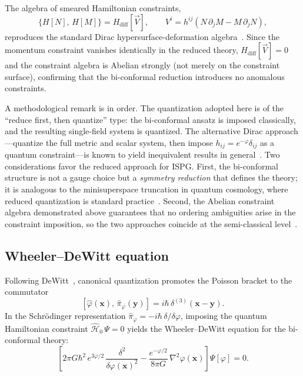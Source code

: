 \documentclass[aps,prd,onecolumn,superscriptaddress,nofootinbib,showpacs,12pt,notitlepage]{revtex4-2}
\begin{document}
The algebra of smeared Hamiltonian constraints,
\begin{equation}\label{eq:HH_algebra}
  \{H[N],\,H[M]\} = H_{\mathrm{diff}}[\vec{V}],\qquad
  V^i = h^{ij}(N\,\partial_j M - M\,\partial_j N),
\end{equation}
reproduces the standard Dirac hypersurface-deformation
algebra~\cite{DeWitt1967}.  Since the momentum constraint
vanishes identically in the reduced theory,
$H_{\mathrm{diff}}[\vec{V}] = 0$ and the constraint algebra
is Abelian strongly (not merely on the constraint surface),
confirming that the bi-conformal reduction introduces no
anomalous constraints.

A methodological remark is in order.  The quantization
adopted here is of the ``reduce first, then quantize''
type: the bi-conformal ansatz is imposed classically,
and the resulting single-field system is quantized.  The
alternative Dirac approach---quantize the full metric and
scalar system, then impose
$h_{ij} = e^{-\varphi}\delta_{ij}$ as a quantum
constraint---is known to yield inequivalent results in
general~\cite{Kuchar1981}.  Two considerations favor the
reduced approach for ISPG\@.  First, the bi-conformal
structure is not a gauge choice but a \emph{symmetry
reduction} that defines the theory; it is analogous to
the minisuperspace truncation in quantum cosmology, where
reduced quantization is standard
practice~\cite{Halliwell1991}.  Second, the Abelian
constraint algebra demonstrated above guarantees that no
ordering ambiguities arise in the constraint imposition,
so the two approaches coincide at the semi-classical
level~\cite{Gotay1986}.

\subsection{Wheeler--DeWitt equation}
\label{sec:wdw}

Following DeWitt~\cite{DeWitt1967}, canonical quantization
promotes the Poisson bracket to the commutator
\begin{equation}\label{eq:comm_phi}
  [\hat{\varphi}(\mathbf{x}),\,
   \hat{\pi}_\varphi(\mathbf{y})]
  = i\hbar\,\delta^{(3)}(\mathbf{x} - \mathbf{y}).
\end{equation}
In the Schr\"odinger representation
$\hat{\pi}_\varphi = -i\hbar\,\delta/\delta\varphi$,
imposing the quantum Hamiltonian constraint
$\hat{\mathcal{H}}_0\,\Psi = 0$ yields the
Wheeler--DeWitt equation for the bi-conformal theory:
\begin{equation}\label{eq:wdw}
  \left[2\pi G\hbar^2\,e^{3\varphi/2}\,
    \frac{\delta^2}{\delta\varphi(\mathbf{x})^2}
  - \frac{e^{-\varphi/2}}{8\pi G}\,
    \nabla^2\varphi(\mathbf{x})
  \right]\Psi[\varphi] = 0.
\end{equation}
\end{document}
